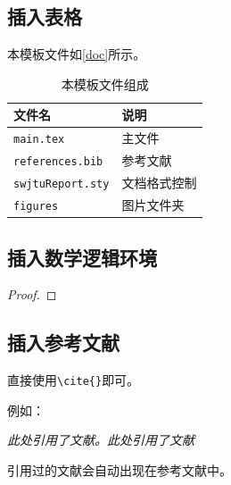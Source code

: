 \subsection{插入表格}
本模板文件如\autoref{doc}所示。
\begin{table}[!htbp]
    \centering
    \begin{tabular}{l|l}
    \hline
        文件名 & 说明 \\
        \hline
        \texttt{main.tex}  & 主文件 \\
        \texttt{references.bib} & 参考文献 \\
        \texttt{swjtuReport.sty}  & 文档格式控制\\
        \texttt{figures}  & 图片文件夹 \\
        \hline
    \end{tabular}
    \caption{本模板文件组成}
    \label{doc}
\end{table}

\subsection{插入数学逻辑环境}
\begin{Theorem}   %
\end{Theorem}

\begin{Lemma}   %
\end{Lemma}

\begin{Corollary}   %
\end{Corollary}

\begin{Proposition}   %
\end{Proposition}

\begin{Definition}   %
\end{Definition}

\begin{Example}   %
\end{Example}

\begin{proof}   %
\end{proof}

\subsection{插入参考文献}
直接使用\verb|\cite{}|即可。

例如：

   \textit{ 此处引用了文献\cite{0Isaac}。此处引用了文献\cite{2016The}}

引用过的文献会自动出现在参考文献中。

